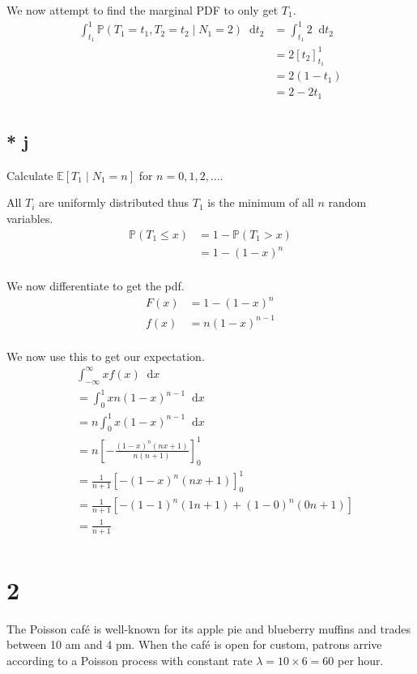 \documentclass{article}
\newcommand{\diff}{\mathop{}\!\mathrm{d}}
\newcommand{\prob}{\mathbb{P}}
\newcommand{\expect}{\mathbb{E}}
\begin{document}
We now attempt to find the marginal PDF to only get $T_1$.
\begin{align*}
    \int_{t_1}^1 \prob(T_1 = t_1, T_2 = t_2 \;|\; N_1 = 2) \diff t_2
    &= \int_{t_1}^1 2 \diff t_2 \\
    &= 2 [t_2]_{t_1}^1 \\
    &= 2 (1 - t_1) \\
    &= 2 - 2t_1 \\
\end{align*}

\subsection{* j}
Calculate $\expect[T_1 \;|\; N_1 = n]$ for $n = 0, 1, 2, \ldots$.

All $T_i$ are uniformly distributed thus $T_1$ is the minimum of all $n$ random
variables.
\begin{align*}
    \prob(T_1 \leq x)
    &= 1 - \prob(T_1 > x) \\
    &= 1 - (1-x)^n \\
\end{align*}

We now differentiate to get the pdf.
\begin{align*}
    F(x) &= 1 - (1-x)^n \\
    f(x) &= n(1-x)^{n-1} \\
\end{align*}

We now use this to get our expectation.
\begin{align*}
    &\int_{-\infty}^\infty x f(x) \diff x \\
    &= \int_{0}^1 x n(1-x)^{n-1} \diff x \\
    &= n \int_{0}^1 x (1-x)^{n-1} \diff x \\
    &= n \left[-\frac{(1-x)^n(nx+1)}{n(n+1)}\right]_0^1 \\
    &= \frac{1}{n+1} \left[-(1-x)^n(nx+1)\right]_0^1 \\
    &= \frac{1}{n+1} \left[-(1-1)^n(1n+1)+(1-0)^n(0n+1)\right] \\
    &= \frac{1}{n+1} \\
\end{align*}

\section{2}
The Poisson caf\'e is well-known for its apple pie and blueberry muffins and
trades
between 10 am and 4 pm. When the caf\'e is open for custom, patrons arrive
according to a Poisson process with constant rate $\lambda = 10 \times 6 = 60$
per hour.
\end{document}
